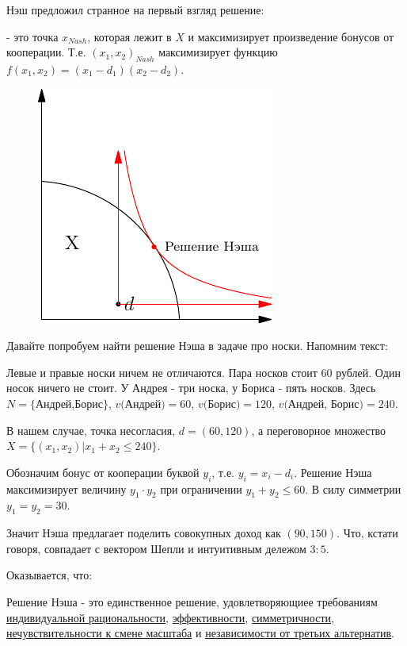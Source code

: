 Нэш предложил странное на первый взгляд решение: 

\begin{mydef}   - это точка $x_{Nash}$, которая
лежит в $X$ и максимизирует произведение бонусов от кооперации. Т.е.
$(x_{1},x_{2})_{Nash}$ максимизирует функцию $f(x_{1},x_{2})=(x_{1}-d_{1})(x_{2}-d_{2})$.
\end{mydef}

\begin{figure}[htbp]
	\includegraphics{coop_nash.pdf}
\end{figure}



Давайте попробуем найти решение Нэша в задаче про носки. Напомним
текст:
\begin{myex} Левые и правые носки ничем не отличаются. Пара носков стоит 60 рублей. Один носок ничего не стоит. У Андрея - три носка, у Бориса - пять носков. Здесь $N=\{$Андрей,Борис$\}$, $v($Андрей$)=60$, $v($Борис$)=120$, $v($Андрей, Борис$)=240$.
\end{myex}

В нашем случае, точка несогласия, $d=(60,120)$, а переговорное множество
$X=\{(x_{1},x_{2})|x_{1}+x_{2}\leq240\}$.

Обозначим бонус от кооперации буквой $y_{i}$, т.е. $y_{i}=x_{i}-d_{i}$.
Решение Нэша максимизирует величину $y_{1}\cdot y_{2}$ при ограничении
$y_{1}+y_{2}\leq60$. В силу симметрии $y_{1}=y_{2}=30$.

Значит Нэша предлагает поделить совокупных доход как $(90,150)$.
Что, кстати говоря, совпадает с вектором Шепли и интуитивным дележом
$3:5$.

Оказывается, что:

\begin{myth} Решение Нэша - это единственное решение, удовлетворяющиее
требованиям \hyperref[irationality]{индивидуальной рациональности}, \hyperref[Pareto]{эффективности}, \hyperref[symmetry]{симметричности}, \hyperref[scale_invariance]{нечувствительности к смене масштаба} и \hyperref[3_invariance]{независимости от третьих альтернатив}.
\end{myth}



